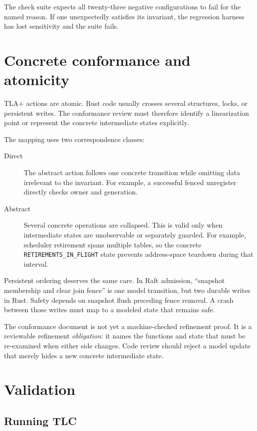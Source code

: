 The check suite expects all twenty-three negative configurations to fail for the named
reason. If one unexpectedly satisfies its invariant, the regression harness
has lost sensitivity and the suite fails.

\section{Concrete conformance and atomicity}

TLA+ actions are atomic. Rust code usually crosses several structures, locks,
or persistent writes. The conformance review must therefore identify a
linearization point or represent the concrete intermediate states explicitly.

The mapping uses two correspondence classes:

\begin{description}
    \item[Direct] The abstract action follows one concrete transition while
        omitting data irrelevant to the invariant. For example, a successful
        fenced unregister directly checks owner and generation.
    \item[Abstract] Several concrete operations are collapsed. This is valid
        only when intermediate states are unobservable or separately guarded.
        For example, scheduler retirement spans multiple tables, so the
        concrete \texttt{RETIREMENTS\_IN\_FLIGHT} state prevents address-space
        teardown during that interval.
\end{description}

Persistent ordering deserves the same care. In Raft admission, ``snapshot
membership and clear join fence'' is one model transition, but two durable
writes in Rust. Safety depends on snapshot flush preceding fence removal. A
crash between those writes must map to a modeled state that remains safe.

The conformance document is not yet a machine-checked refinement proof. It is
a reviewable refinement \emph{obligation}: it names the functions and state
that must be re-examined when either side changes. Code review should reject a
model update that merely hides a new concrete intermediate state.

\section{Validation}

\subsection{Running TLC}

